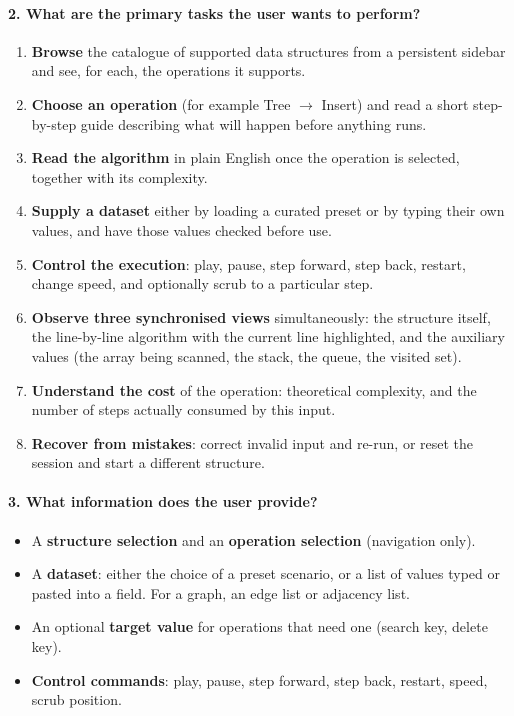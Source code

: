 \documentclass[11pt,a4paper]{article}
\begin{document}
\paragraph{2. What are the primary tasks the user wants to perform?}
\begin{enumerate}[leftmargin=1.6em,itemsep=2pt]
  \item \textbf{Browse} the catalogue of supported data structures from a persistent
        sidebar and see, for each, the operations it supports.
  \item \textbf{Choose an operation} (for example Tree $\rightarrow$ Insert) and read a
        short step-by-step guide describing what will happen before anything runs.
  \item \textbf{Read the algorithm} in plain English once the operation is selected,
        together with its complexity.
  \item \textbf{Supply a dataset} either by loading a curated preset or by typing their
        own values, and have those values checked before use.
  \item \textbf{Control the execution}: play, pause, step forward, step back, restart,
        change speed, and optionally scrub to a particular step.
  \item \textbf{Observe three synchronised views} simultaneously: the structure itself,
        the line-by-line algorithm with the current line highlighted, and the auxiliary
        values (the array being scanned, the stack, the queue, the visited set).
  \item \textbf{Understand the cost} of the operation: theoretical complexity, and the
        number of steps actually consumed by this input.
  \item \textbf{Recover from mistakes}: correct invalid input and re-run, or reset the
        session and start a different structure.
\end{enumerate}

\paragraph{3. What information does the user provide?}
\begin{itemize}[leftmargin=1.6em,itemsep=2pt]
  \item A \textbf{structure selection} and an \textbf{operation selection} (navigation
        only).
  \item A \textbf{dataset}: either the choice of a preset scenario, or a list of values
        typed or pasted into a field. For a graph, an edge list or adjacency list.
  \item An optional \textbf{target value} for operations that need one (search key,
        delete key).
  \item \textbf{Control commands}: play, pause, step forward, step back, restart, speed,
        scrub position.
\end{itemize}
\end{document}
